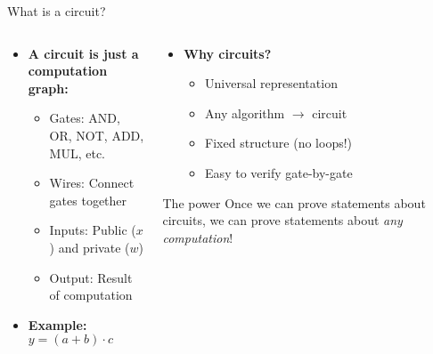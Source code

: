 \documentclass[aspectratio=169, lualatex, handout]{beamer}
\begin{document}
\begin{frame}{What is a circuit?}
	\begin{columns}[c]
		\begin{column}{0.5\textwidth}
			\begin{itemize}
				\item \textbf{A circuit is just a computation graph:}
				      \begin{itemize}
					      \item Gates: AND, OR, NOT, ADD, MUL, etc.
					      \item Wires: Connect gates together
					      \item Inputs: Public ($x$) and private ($w$)
					      \item Output: Result of computation
				      \end{itemize}
				\item \textbf{Example: $y = (a + b) \cdot c$}
				      \begin{center}
				      \end{center}
			\end{itemize}
		\end{column}
		\begin{column}{0.5\textwidth}
			\begin{itemize}
				\item \textbf{Why circuits?}
				      \begin{itemize}
					      \item Universal representation
					      \item Any algorithm $\rightarrow$ circuit
					      \item Fixed structure (no loops!)
					      \item Easy to verify gate-by-gate
				      \end{itemize}
			\end{itemize}
			\begin{exampleblock}{The power}
				Once we can prove statements about circuits, we can prove statements about \textit{any computation}!
			\end{exampleblock}
		\end{column}
	\end{columns}
\end{frame}
\end{document}

